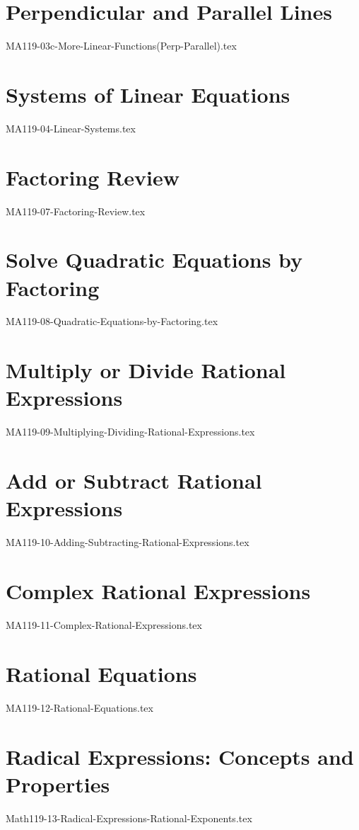 \documentclass[11pt, math=mtpro2, color=blue, lang=en, mode=fancy]{CLS/elegantbookr}
\begin{document}
\chapter{Perpendicular and Parallel Lines}
{MA119-03c-More-Linear-Functions(Perp-Parallel).tex}
\newpage


\chapter{Systems of Linear Equations}
{MA119-04-Linear-Systems.tex}
\newpage


\chapter{Factoring Review}
{MA119-07-Factoring-Review.tex}
\newpage


\chapter{Solve Quadratic Equations by Factoring}
{MA119-08-Quadratic-Equations-by-Factoring.tex}
\newpage


\chapter{Multiply or Divide Rational Expressions}
{MA119-09-Multiplying-Dividing-Rational-Expressions.tex}
\newpage

\chapter{Add or Subtract Rational Expressions}
{MA119-10-Adding-Subtracting-Rational-Expressions.tex}
\newpage

\chapter{Complex Rational Expressions}
{MA119-11-Complex-Rational-Expressions.tex}
\newpage


\chapter{Rational Equations}
{MA119-12-Rational-Equations.tex}
\newpage


\chapter{Radical Expressions: Concepts and Properties}
{Math119-13-Radical-Expressions-Rational-Exponents.tex}
\newpage
\end{document}

